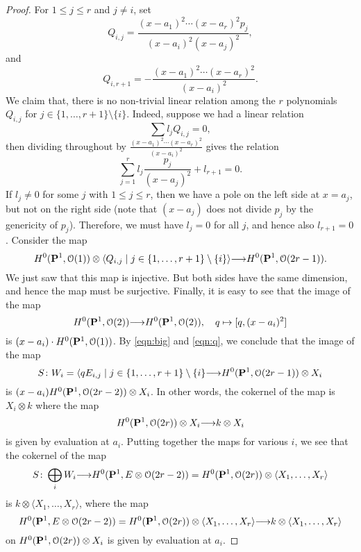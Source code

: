 \documentclass[11pt,reqno]{amsart}
\theoremstyle{plain}
\theoremstyle{definition}
\theoremstyle{remark}
\numberwithin{equation}{section}
\renewcommand{\k}{k}
\renewcommand{\to}{{\longrightarrow}}
\numberwithin{equation}{section}
\renewcommand{\O}{\mathcal O}
\begin{document}
\begin{proof}
  For $1 \leq j \leq r$ and $j \neq i$, set
  \[
    Q_{i,j} = \frac{(x-a_1)^2 \cdots (x-a_r)^2p_j}{(x-a_i)^2(x-a_j)^2}, 
  \]
  and
  \[
    Q_{i,r+1} = - \frac{(x-a_1)^2 \cdots (x-a_r)^2}{(x-a_i)^2}.
  \]
  We claim that, there is no non-trivial linear relation among the $r$ polynomials $Q_{i,j}$ for $j \in \{1, \dots, r+1\} \setminus \{i\}$.
  Indeed, suppose we had a linear relation
  \[ \sum l_j Q_{i,j} = 0,\]
  then dividing throughout by $\frac{(x-a_1)^2\cdots (x-a_r)^2}{(x-a_i)^2}$ gives the relation
  \[ \sum_{j = 1}^r l_j \frac{p_j}{(x-a_j)^2} + l_{r+1} = 0.\]
  If $l_j \neq 0$ for some $j$ with $1 \leq j \leq r$, then we have a pole on the left side at $x = a_j$, but not on the right side (note that $(x-a_j)$ does not divide $p_j$ by the genericity of $p_j$).
  Therefore, we must have $l_j = 0$ for all $j$, and hence also $l_{r+1} = 0$.
  Consider the map
  \begin{equation}\label{eqn:big}
    H^0(\P^1, \O(1)) \otimes \langle  Q_{i,j} \mid j \in \{1, \dots, r+1\} \setminus \{i\}\rangle \to H^0(\P^1, \O(2r-1)).
  \end{equation}
  We just saw that this map is injective.
  But both sides have the same dimension, and hence the map must be surjective.
  Finally, it is easy to see that the image of the map
  \begin{equation}\label{eqn:q}
    H^0(\P^1, \O(2)) \to H^0(\P^1, \O(2)), \quad q \mapsto [q, (x-a_i)^2]
  \end{equation}
  is $(x-a_i)\cdot H^0(\P^1, \O(1))$.
  By \eqref{eqn:big} and \eqref{eqn:q}, we conclude that the image of the map
  \[ S \from W_i = \langle qE_{i,j} \mid j \in\{1, \dots, r+1\} \setminus \{i\} \to H^0(\P^1, \O(2r-1)) \otimes X_i\]
  is $(x-a_i)H^0(\P^1, \O(2r-2)) \otimes X_i$.
  In other words, the cokernel of the map is $X_i \otimes \k$ where the map
  \[H^0(\P^1, \O(2r)) \otimes X_i \to \k \otimes X_i \]
  is given by evaluation at $a_i$.
  Putting together the maps for various $i$, we see that the cokernel of the map
  \[ S \from \bigoplus_i W_i \to H^0(\P^1, E \otimes \O(2r-2)) = H^0(\P^1, \O(2r)) \otimes \langle  X_1, \dots, X_r \rangle\]
  is $\k \otimes \langle  X_1, \dots, X_r \rangle$, where the map
  \begin{equation}\label{eqn:partialsur}
    H^0(\P^1, E \otimes \O(2r-2)) = H^0(\P^1, \O(2r)) \otimes \langle  X_1, \dots, X_r \rangle \to \k \otimes \langle  X_1, \dots, X_r \rangle
  \end{equation}
  on $H^0(\P^1, \O(2r)) \otimes X_i$ is given by evaluation at $a_i$.


\end{proof}
\end{document}

